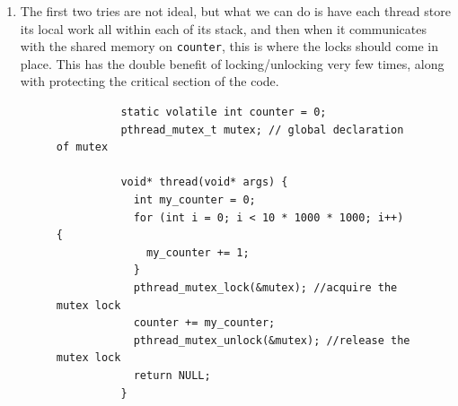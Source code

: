 \documentclass{article}
\newcounter{code}[section]
\begin{document}
\begin{enumerate}
\begin{figure}[H]
\begin{lstlisting}
          void* thread(void* args) {
            for (int i = 0; i < 10 * 1000 * 1000; i++) {
              pthread_mutex_lock(&mutex); //acquire the mutex lock
              counter += 1; 
              pthread_mutex_unlock(&mutex); //release the mutex lock
            }
            return NULL; 
          }

          int main(int argc, char *argv[]) {
            pthread_t thread1, thread2; 
            int rc; 
            rc = pthread_mutex_init(&mutex, NULL); //initialize the mutex
            rc = pthread_create(&thread1, NULL, thread, "A"); 
            rc = pthread_create(&thread2, NULL, thread, "B"); 
            rc = pthread_join(thread1, NULL); 
            rc = pthread_join(thread2, NULL); 
            pthread_mutex_destroy(&mutex); //destroy (free) the mutex
            printf("Counter : %d\n", counter); 
            return 0; 
          }
        \end{lstlisting}
        \caption{Now we put the locks within the counter. However, this is much slower since locking and unlocking are relatively expensive. It runs in 0.274s. } 
        \label{fig:second_try}
      \end{figure}

      \item The first two tries are not ideal, but what we can do is have each thread store its local work all within each of its stack, and then when it communicates with the shared memory on \texttt{counter}, this is where the locks should come in place. This has the double benefit of locking/unlocking very few times, along with protecting the critical section of the code. 

      \begin{figure}[H]
        \centering 
        \begin{lstlisting}
          static volatile int counter = 0; 
          pthread_mutex_t mutex; // global declaration of mutex

          void* thread(void* args) {
            int my_counter = 0; 
            for (int i = 0; i < 10 * 1000 * 1000; i++) {
              my_counter += 1; 
            }
            pthread_mutex_lock(&mutex); //acquire the mutex lock
            counter += my_counter; 
            pthread_mutex_unlock(&mutex); //release the mutex lock
            return NULL; 
          }


\end{lstlisting}
\end{figure}
\end{enumerate}
\end{document}
